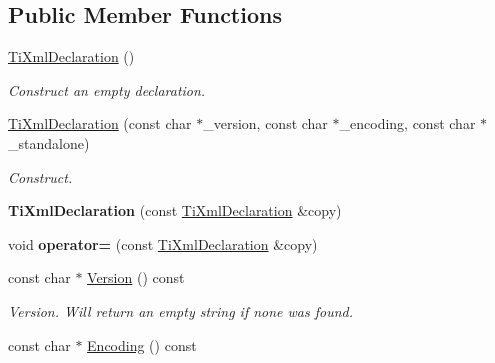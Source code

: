 \subsection*{\-Public \-Member \-Functions}
\begin{DoxyCompactItemize}
\item 
\hypertarget{classTiXmlDeclaration_aa0484d059bea0ea1acb47c9094382d79}{
\hyperlink{classTiXmlDeclaration_aa0484d059bea0ea1acb47c9094382d79}{\-Ti\-Xml\-Declaration} ()}
\label{d2/df2/classTiXmlDeclaration_aa0484d059bea0ea1acb47c9094382d79}

\begin{DoxyCompactList}\small\item\em \-Construct an empty declaration. \end{DoxyCompactList}\item 
\hypertarget{classTiXmlDeclaration_a3b618d1c30c25e4b7a71f31a595ee298}{
\hyperlink{classTiXmlDeclaration_a3b618d1c30c25e4b7a71f31a595ee298}{\-Ti\-Xml\-Declaration} (const char $\ast$\-\_\-version, const char $\ast$\-\_\-encoding, const char $\ast$\-\_\-standalone)}
\label{d2/df2/classTiXmlDeclaration_a3b618d1c30c25e4b7a71f31a595ee298}

\begin{DoxyCompactList}\small\item\em \-Construct. \end{DoxyCompactList}\item 
\hypertarget{classTiXmlDeclaration_a58ac9042c342f7845c8491da0bb091e8}{
{\bfseries \-Ti\-Xml\-Declaration} (const \hyperlink{classTiXmlDeclaration}{\-Ti\-Xml\-Declaration} \&copy)}
\label{d2/df2/classTiXmlDeclaration_a58ac9042c342f7845c8491da0bb091e8}

\item 
\hypertarget{classTiXmlDeclaration_a0fedc57539af9049be8db2d7d9d9ba33}{
void {\bfseries operator=} (const \hyperlink{classTiXmlDeclaration}{\-Ti\-Xml\-Declaration} \&copy)}
\label{d2/df2/classTiXmlDeclaration_a0fedc57539af9049be8db2d7d9d9ba33}

\item 
\hypertarget{classTiXmlDeclaration_a02ee557b1a4545c3219ed377c103ec76}{
const char $\ast$ \hyperlink{classTiXmlDeclaration_a02ee557b1a4545c3219ed377c103ec76}{\-Version} () const }
\label{d2/df2/classTiXmlDeclaration_a02ee557b1a4545c3219ed377c103ec76}

\begin{DoxyCompactList}\small\item\em \-Version. \-Will return an empty string if none was found. \end{DoxyCompactList}\item 
\hypertarget{classTiXmlDeclaration_a5d974231f9e9a2f0542f15f3a46cdb76}{
const char $\ast$ \hyperlink{classTiXmlDeclaration_a5d974231f9e9a2f0542f15f3a46cdb76}{\-Encoding} () const }
\label{d2/df2/classTiXmlDeclaration_a5d974231f9e9a2f0542f15f3a46cdb76}


\end{DoxyCompactItemize}
